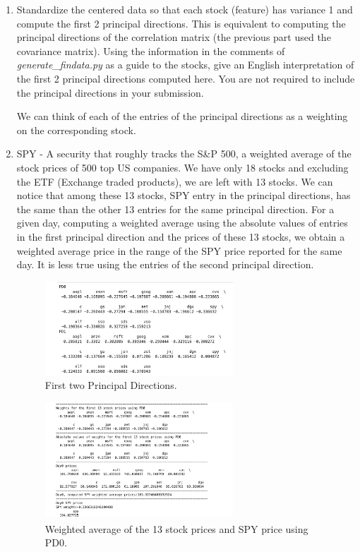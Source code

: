 \documentclass[12pt,twoside]{article}
\begin{document}
\begin{enumerate}
\begin{enumerate}
  \item Standardize the centered data so that each stock (feature) has
    variance 1 and compute the first 2 principal directions.  This is
    equivalent to computing the principal directions of the
    correlation matrix (the previous part used the covariance
    matrix).  Using the information in the comments of
   \emph{generate\_findata.py} as a guide to the stocks, 
    give an English interpretation of the first 2 principal directions
    computed here. 
    You are not required to include the principal directions in
    your submission.
     
    We can think of each of the entries of the principal directions as a weighting on the corresponding stock.  
    	\bi
    		\item SPY - A security that roughly tracks the S\&P 500, a weighted average of the stock prices of 500 top US companies.
		We have only 18 stocks and excluding the ETF (Exchange traded products), we are left with 13 stocks. 
		We can notice that among these 13 stocks, SPY entry in the principal directions, has the same than the other 13 entries
		for the same principal direction.
		For a given day, computing a weighted average using the absolute values of entries in the first principal direction and the prices of these 13 stocks, 
		we obtain a weighted average price in the range of the SPY price reported for the same day. It is less true using the entries of the second principal direction.

		\begin{figure}[H]
			\centering
			\includegraphics[width=200pt]{figures/pb_3_b_principal_directions.png}
			\caption{First two Principal Directions.}
			\label{fig3}
		\end{figure}

		\begin{figure}[H]
			\centering
			\includegraphics[width=200pt]{figures/pb_3_b_1.png}
			\caption{Weighted average of the 13 stock prices and SPY price using PD0.}
			\label{fig2}
		\end{figure}
					

\end{enumerate}
\end{enumerate}
\end{document}
